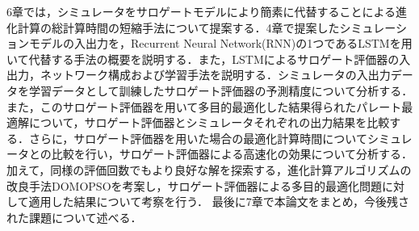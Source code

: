 6章では，シミュレータをサロゲートモデルにより簡素に代替することによる進化計算の総計算時間の短縮手法について提案する．4章で提案したシミュレーションモデルの入出力を，Recurrent Neural Network(RNN)の1つであるLSTMを用いて代替する手法の概要を説明する．また，LSTMによるサロゲート評価器の入出力，ネットワーク構成および学習手法を説明する．シミュレータの入出力データを学習データとして訓練したサロゲート評価器の予測精度について分析する．また，このサロゲート評価器を用いて多目的最適化した結果得られたパレート最適解について，サロゲート評価器とシミュレータそれぞれの出力結果を比較する．さらに，サロゲート評価器を用いた場合の最適化計算時間についてシミュレータとの比較を行い，サロゲート評価器による高速化の効果について分析する．加えて，同様の評価回数でもより良好な解を探索する，進化計算アルゴリズムの改良手法DOMOPSOを考案し，サロゲート評価器による多目的最適化問題に対して適用した結果について考察を行う．
最後に7章で本論文をまとめ，今後残された課題について述べる．

